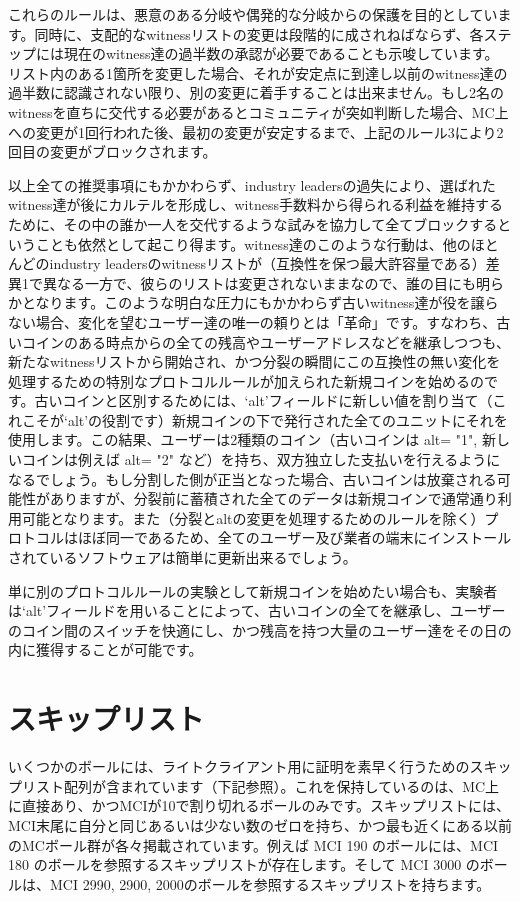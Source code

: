 \documentclass[a4paper, dvipdfmx]{jsarticle}
\begin{document}
\noindent これらのルールは、悪意のある分岐や偶発的な分岐からの保護を目的としています。同時に、支配的なwitnessリストの変更は段階的に成されねばならず、各ステップには現在のwitness達の過半数の承認が必要であることも示唆しています。リスト内のある1箇所を変更した場合、それが安定点に到達し以前のwitness達の過半数に認識されない限り、別の変更に着手することは出来ません。もし2名のwitnessを直ちに交代する必要があるとコミュニティが突如判断した場合、MC上への変更が1回行われた後、最初の変更が安定するまで、上記のルール3により2回目の変更がブロックされます。

以上全ての推奨事項にもかかわらず、industry leadersの過失により、選ばれたwitness達が後にカルテルを形成し、witness手数料から得られる利益を維持するために、その中の誰か一人を交代するような試みを協力して全てブロックするということも依然として起こり得ます。witness達のこのような行動は、他のほとんどのindustry leadersのwitnessリストが（互換性を保つ最大許容量である）差異1で異なる一方で、彼らのリストは変更されないままなので、誰の目にも明らかとなります。このような明白な圧力にもかかわらず古いwitness達が役を譲らない場合、変化を望むユーザー達の唯一の頼りとは「革命」です。すなわち、古いコインのある時点からの全ての残高やユーザーアドレスなどを継承しつつも、新たなwitnessリストから開始され、かつ分裂の瞬間にこの互換性の無い変化を処理するための特別なプロトコルルールが加えられた新規コインを始めるのです。古いコインと区別するためには、`alt'フィールドに新しい値を割り当て（これこそが`alt'の役割です）新規コインの下で発行された全てのユニットにそれを使用します。この結果、ユーザーは2種類のコイン（古いコインは alt= "1", 新しいコインは例えば alt= "2" など）を持ち、双方独立した支払いを行えるようになるでしょう。もし分割した側が正当となった場合、古いコインは放棄される可能性がありますが、分裂前に蓄積された全てのデータは新規コインで通常通り利用可能となります。また（分裂とaltの変更を処理するためのルールを除く）プロトコルはほぼ同一であるため、全てのユーザー及び業者の端末にインストールされているソフトウェアは簡単に更新出来るでしょう。

単に別のプロトコルルールの実験として新規コインを始めたい場合も、実験者は`alt'フィールドを用いることによって、古いコインの全てを継承し、ユーザーのコイン間のスイッチを快適にし、かつ残高を持つ大量のユーザー達をその日の内に獲得することが可能です。

\section{スキップリスト}
いくつかのボールには、ライトクライアント用に証明を素早く行うためのスキップリスト配列が含まれています（下記参照）。これを保持しているのは、MC上に直接あり、かつMCIが10で割り切れるボールのみです。スキップリストには、MCI末尾に自分と同じあるいは少ない数のゼロを持ち、かつ最も近くにある以前のMCボール群が各々掲載されています。例えば MCI 190 のボールには、MCI 180 のボールを参照するスキップリストが存在します。そして MCI 3000 のボールは、MCI 2990, 2900, 2000のボールを参照するスキップリストを持ちます。
\end{document}
